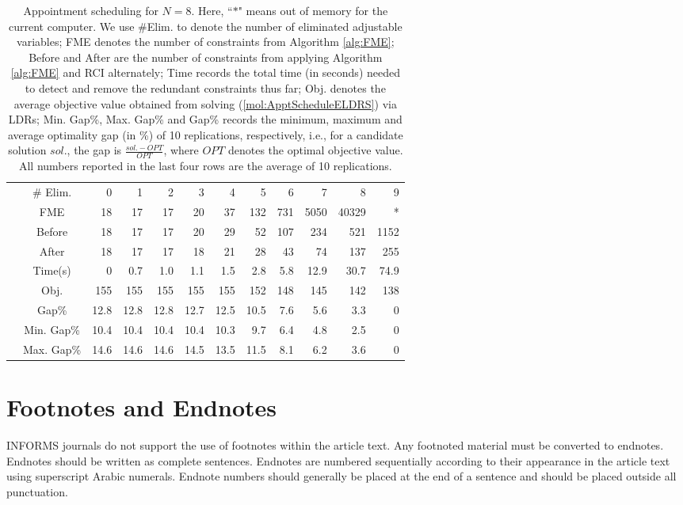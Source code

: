 \documentclass[fleqn,isre,blindrev]{informs4}
\begin{document}
		\begin{table*}[t]
			\centering
			\caption{Appointment scheduling for $N=8$. Here, ``$*$" means out of memory for the current computer. We use \#Elim. to denote the number of eliminated adjustable variables; FME denotes the number of constraints from Algorithm \ref{alg:FME}; Before and After are the number of constraints from applying Algorithm \ref{alg:FME} and RCI alternately; Time records the total time (in seconds) needed to detect and remove the redundant constraints thus far; Obj. denotes the average objective value obtained from solving (\ref{mol:ApptScheduleELDRS}) via LDRs; Min. Gap\%, Max. Gap\% and Gap\% records the minimum, maximum and average optimality gap (in \%) of 10 replications, respectively, i.e., for a candidate solution $sol.$, the gap is $\frac{sol. - OPT}{OPT}$,  {where $OPT$ denotes the optimal objective value}. All numbers reported in the last four rows are the average of 10 replications.}
\def\arraystretch{1.3}			\begin{tabular}{rc|rrrrrrrrrr}
				\cline{2-12}
				& \# Elim. & 0     & 1     & 2     & 3     & 4     & 5     & 6     & 7     & 8     & 9 \\ \cline{2-12}
			 & FME   & 18    & 17    & 17    & 20    & 37    & 132   & 731   & 5050  & 40329 & * \\ 
				& Before & 18    & 17    & 17    & 20    & 29    & 52    & 107   & 234   & 521   & 1152 \\
				& After & 18    & 17    & 17    & 18    & 21    & 28    & 43    & 74    & 137   & 255 \\
				& Time(s)  & 0    & 0.7   & 1.0   & 1.1   & 1.5   & 2.8   & 5.8   & 12.9    & 30.7  & 74.9 \\ \cline{3-12}
				& Obj.  & 155   & 155   & 155   & 155   & 155   & 152   & 148   & 145   & 142   & 138 \\
				& Gap\% & 12.8  & 12.8  & 12.8  & 12.7  & 12.5  & 10.5  & 7.6   & 5.6   & 3.3   & 0 \\
				& Min. Gap\% & 10.4  & 10.4  & 10.4  & 10.4  & 10.3  & 9.7   & 6.4   & 4.8   & 2.5   & 0 \\
				& Max. Gap\% & 14.6  & 14.6  & 14.6  & 14.5  & 13.5  & 11.5  & 8.1   & 6.2   & 3.6   & 0 \\ \cline{2-12}
			\end{tabular}%
			\label{tab:AS}\vspace*{18pt}%
		\end{table*}%

\section{Footnotes and Endnotes}\label{footsection1}
INFORMS journals do not support the use of footnotes within the article text. Any footnoted material must be converted to endnotes. Endnotes should be written as complete sentences. Endnotes are numbered sequentially according to their appearance in the article text using superscript Arabic numerals. Endnote numbers should generally be placed at the end of a sentence and should be placed outside all punctuation.
\end{document}
